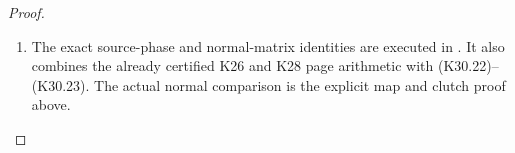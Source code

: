 \begin{proof}
\begin{enumerate}[label=\arabic*.]
\par

\medskip\noindent\textbf{Certificate}

\par\nobreak

\item The exact source-phase and normal-matrix identities are
executed in . It also
combines the already certified K26 and K28 page arithmetic
with (K30.22)--(K30.23). The actual normal comparison is
the explicit map and clutch proof above.

\end{enumerate}
\end{proof}